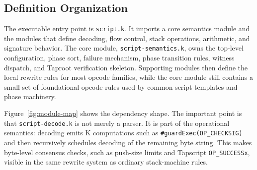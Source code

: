 \documentclass[conference]{IEEEtran}
\begin{document}
\subsection{Definition Organization}

The executable entry point is \texttt{script.k}.  It imports a core semantics
module and the modules that define decoding, flow control, stack operations,
arithmetic, and signature behavior.  The core module,
\texttt{script-semantics.k}, owns the top-level configuration, phase sort,
failure mechanism, phase transition rules, witness dispatch, and Taproot
verification skeleton.  Supporting modules then define the local rewrite rules
for most opcode families, while the core module still contains a small set of
foundational opcode rules used by common script templates and phase machinery.

Figure~\ref{fig:module-map} shows the dependency shape.  The important point is
that \texttt{script-decode.k} is not merely a parser.  It is part of the
operational semantics: decoding emits K computations such as
\texttt{\#guardExec(OP\_CHECKSIG)} and then recursively schedules decoding of
the remaining byte string.  This makes byte-level consensus checks, such as
push-size limits and Tapscript \texttt{OP\_SUCCESSx}, visible in the same
rewrite system as ordinary stack-machine rules.
\end{document}
